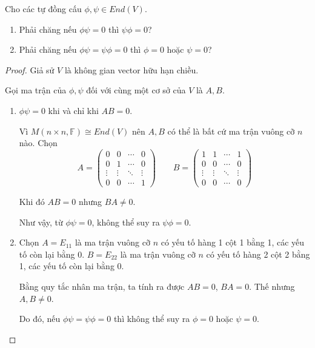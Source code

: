 \documentclass[class=linearalgebra,crop=false]{standalone}
\begin{document}
\begin{exercise}
    Cho các tự đồng cấu $\phi, \psi\in End(V)$.
    \begin{enumerate}[label = (\alph*)]
        \item Phải chăng nếu $\phi\psi = 0$ thì $\psi\phi = 0$?
        \item Phải chăng nếu $\phi\psi = \psi\phi = 0$ thì $\phi = 0$ hoặc $\psi = 0$?
    \end{enumerate}
\end{exercise}

\begin{proof}
    Giả sử $V$ là không gian vector hữu hạn chiều.
    \par Gọi ma trận của $\phi, \psi$ đối với cùng một cơ sở của $V$ là $A, B$.
    \begin{enumerate}[label = (\alph*)]
        \item $\phi\psi = 0$ khi và chỉ khi $AB = 0$.
            \par Vì $M(n\times n,\mathbb{F})\cong End(V)$ nên $A, B$ có thể là bất cứ ma trận vuông cỡ $n$ nào. Chọn
            \[
                A =
                \begin{pmatrix}
                    0 & 0 & \cdots & 0 \\
                    0 & 1 & \cdots & 0 \\
                    \vdots & \vdots & \ddots & \vdots \\
                    0 & 0 & \cdots & 1
                \end{pmatrix}\qquad
                B =
                \begin{pmatrix}
                    1 & 1 & \cdots & 1 \\
                    0 & 0 & \cdots & 0 \\
                    \vdots & \vdots & \ddots & \vdots \\
                    0 & 0 & \cdots & 0
                \end{pmatrix}
            \]
            \par Khi đó $AB = 0$ nhưng $BA\ne 0$.
            \par Như vậy, từ $\phi\psi = 0$, không thể suy ra $\psi\phi = 0$.
        \item Chọn $A = E_{11}$ là ma trận vuông cỡ $n$ có yếu tố hàng 1 cột 1 bằng 1, các yếu tố còn lại bằng 0. $B = E_{22}$ là ma trận vuông cỡ $n$ có yếu tố hàng 2 cột 2 bằng 1, các yếu tố còn lại bằng 0.
            \par Bằng quy tắc nhân ma trận, ta tính ra được $AB = 0$, $BA = 0$. Thế nhưng $A, B\ne 0$.
            \par Do đó, nếu $\phi\psi = \psi\phi = 0$ thì không thể suy ra $\phi = 0$ hoặc $\psi = 0$.
    \end{enumerate}
\end{proof}
\end{document}
